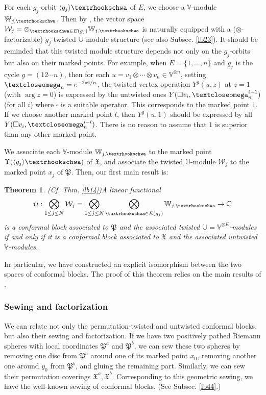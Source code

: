 \documentclass[12pt,a4paper,notitlepage]{article}
\theoremstyle{definition}
\theoremstyle{plain}
\newtheorem{Mthm}{Theorem}
\newcommand{\fk}{\mathfrak}
\newcommand{\mc}{\mathcal}
\newcommand{\bk}[1]{\langle {#1}\rangle}
\newcommand{\im}{\mathbf{i}}
\newcommand{\Vbb}{\mathbb V}
\newcommand{\Ubb}{\mathbb U}
\newcommand{\Wbb}{\mathbb W}
\newcommand{\Cbb}{\mathbb C}
\newcommand{\tipaomega}{\text{\textcloseomega}}
\newcommand{\tipae}{\text{\textrhookschwa}}
\numberwithin{equation}{subsection}
\begin{document}
For each $g_j$-orbit $\bk{g_j}\tipae$ of $E$, we choose a $\Vbb$-module $\Wbb_{j,\tipae}$. Then by \cite{BDM02}, the vector space $\mc W_j=\otimes_{\tipae\in E(g_j)}\Wbb_{j,\tipae}$ is naturally equipped with a ($\otimes$-factorizable) $g_j$-twisted $\Ubb$-module structure (see also Subsec. \ref{lb23}). It should be reminded that this twisted module structure depends not only on the $g_j$-orbits but also on their marked points. For example, when $E=\{1,\dots,n\}$ and $g_j$ is the cycle $g=(12\cdots n)$, then for each $u=v_1\otimes\cdots \otimes v_n\in\Vbb^{\otimes n}$, setting $\tipaomega_n=e^{-2\pi\im/n}$, the twisted vertex operation $Y^g(u,z)$ at $z=1$ (with $\arg z=0$) is expressed by the untwisted ones $Y(\square v_i,\tipaomega_n^{i-1})$ (for all $i$) where $\square$ is a suitable operator. This corresponds to the marked point $1$. If we choose another marked point $l$, then $Y^g(u,1)$ should be expressed by all  $Y(\square v_i,\tipaomega_n^{i-l})$. There is no reason to assume that $1$ is superior than any other marked point.

We associate each $\Vbb$-module $\Wbb_{j,\tipae}$ to the marked point $\Upsilon(\bk{g_j}\tipae)$ of $\fk X$, and associate the twisted $\Ubb$-module $\mc W_j$ to the marked point $x_j$ of $\fk P$. Then, our first main result is:
\begin{Mthm}(Cf. Thm. \ref{lb14})\label{lb69}
A linear functional
\begin{align*}
\uppsi:\bigotimes_{1\leq j\leq N}\mc W_j=\bigotimes_{1\leq j\leq N}\bigotimes_{\tipae\in E(g_j)}\Wbb_{j,\tipae}\rightarrow\Cbb
\end{align*}
is a conformal block associated to $\fk P$ and the associated twisted $\Ubb=\Vbb^{\otimes E}$-modules if and only if it is a conformal block associated to $\fk X$ and the associated untwisted $\Vbb$-modules.
\emph{}
\end{Mthm}
In particular, we have constructed an explicit isomorphism between the two spaces of conformal blocks. The proof of this theorem relies on the main results of \cite{Gui21b}.


\subsubsection*{Sewing and factorization}



We can relate not only  the permutation-twisted and untwisted conformal blocks, but also their sewing and factorization. If we have two positively pathed Riemann spheres with local coordinates $\fk P^a$ and $\fk P^b$, we can sew these two spheres by removing one disc from $\fk P^a$ around one of its marked point $x_0$, removing another one around $y_0$ from $\fk P^b$, and gluing the remaining part. Similarly, we can sew their permutation coverings $\fk X^a,\fk X^b$. Corresponding to this geometric sewing, we have the well-known sewing of conformal blocks. (See Subsec. \ref{lb44}.)
\end{document}
